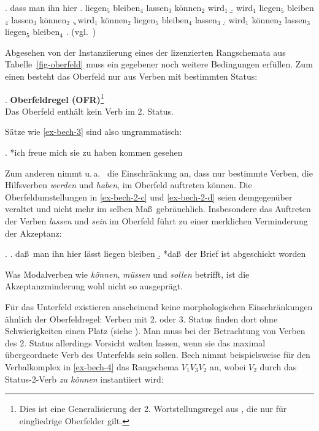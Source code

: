 \ex. dass man ihn hier \label{ex-bech-2}
\a. liegen$_5$ bleiben$_4$ lassen$_3$ können$_2$ wird$_1$
\b. wird$_1$ liegen$_5$ bleiben$_4$ lassen$_3$ können$_2$ 
\c. wird$_1$ können$_2$ liegen$_5$ bleiben$_4$ lassen$_3$  \label{ex-bech-2-c}
\d. wird$_1$ können$_2$ lassen$_3$ liegen$_5$ bleiben$_4$  \label{ex-bech-2-d}
\z. (vgl.\ \citealt[\S 61]{Bech:55})  

Abgesehen von der Instanziierung eines der lizenzierten Rangschemata aus Tabelle~\ref{fig-oberfeld} muss ein gegebener  noch weitere Bedingungen erfüllen. Zum einen besteht das Oberfeld nur aus Verben mit bestimmten Status: 

\ex. \label{ex-ofr} \textbf{Oberfeldregel (OFR)}\footnote{Dies ist eine Generalisierung der 2. Wortstellungsregel aus \citet[\S 11]{Bech:63}, die nur für eingliedrige Oberfelder gilt.} \\
Das Oberfeld enthält kein Verb im 2. Status.

Sätze wie \ref{ex-bech-3} sind also ungrammatisch:

\ex. *ich freue mich sie zu haben kommen gesehen \hfill \citep[\S 11]{Bech:63}\label{ex-bech-3}

Zum anderen nimmt u.\,a.\ \citet[75ff]{Meurers:99} die Einschränkung an, dass nur bestimmte Verben, die Hilfsverben {\it werden} und {\it haben}, im Oberfeld auftreten können. Die Oberfeldumstellungen in \ref{ex-bech-2-c} und \ref{ex-bech-2-d} seien demgegenüber veraltet und nicht mehr im selben Ma\ss \ gebräuchlich. Insbesondere das Auftreten der Verben {\it lassen} und {\it sein} im Oberfeld führt zu einer merklichen Verminderung der Akzeptanz:

\ex. 
\a. da\ss \ man ihn hier lässt liegen bleiben \hfill \citep[\S 61]{Bech:55} 
\b. *da\ss \ der Brief ist abgeschickt worden \hfill \citep[(125a)]{Meurers:99}

Was Modalverben wie {\it können}, {\it müssen} und {\it sollen} betrifft, ist die Akzeptanzminderung wohl nicht so ausgeprägt. 

Für das Unterfeld existieren anscheinend keine morphologischen Einschränkungen ähnlich der Oberfeldregel: Verben mit 2. oder 3. Status finden dort ohne Schwierigkeiten einen Platz (siehe \citealt[80ff]{Meurers:99}). Man muss bei der Betrachtung von Verben des 2. Status allerdings Vorsicht walten lassen, wenn sie das maximal übergeordnete Verb des Unterfelds sein sollen. Bech nimmt beispielsweise für den Verbalkomplex  in \ref{ex-bech-4} das Rangschema $V_1 V_3 V_2$ an, wobei $V_2$ durch das Status-2-Verb {\it zu können} instantiiert wird:

